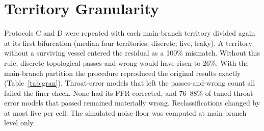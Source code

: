 \documentclass[journal,twoside,web,onecolumn]{ieeecolor}
\begin{document}
\section{Territory Granularity}\label{sec:granularity}
Protocols C and D were repeated with each main-branch territory divided again at its first bifurcation (median four territories, discrete; five, leaky). A territory without a surviving vessel entered the residual as a 100\% mismatch. Without this rule, discrete topological passes-and-wrong would have risen to 26\%. With the main-branch partition the
procedure reproduced the original results exactly (Table~\ref{tab:gran}). Throat-error models that left the passes-and-wrong count
all failed the finer check. None had its FFR corrected, and 76--88\% of tuned throat-error models that passed remained
materially wrong. Reclassifications changed by at most five per cell. The simulated noise floor was computed at
main-branch level only.
\end{document}
